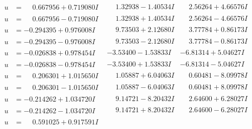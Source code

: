 \documentclass[1p]{elsarticle_modified}
\theoremstyle{definition}
\begin{document}
$$\begin{array}{c|c|c}
\begin{aligned}
u &= \phantom{-}0.667956 + 0.719080 I\end{aligned}
 & \phantom{-}1.32938 - 1.40534 I & \phantom{-}2.56264 + 4.66576 I \\ \hline\begin{aligned}
u &= \phantom{-}0.667956 - 0.719080 I\end{aligned}
 & \phantom{-}1.32938 + 1.40534 I & \phantom{-}2.56264 - 4.66576 I \\ \hline\begin{aligned}
u &= -0.294395 + 0.976008 I\end{aligned}
 & \phantom{-}9.73503 + 2.12680 I & \phantom{-}3.77784 + 0.86173 I \\ \hline\begin{aligned}
u &= -0.294395 - 0.976008 I\end{aligned}
 & \phantom{-}9.73503 - 2.12680 I & \phantom{-}3.77784 - 0.86173 I \\ \hline\begin{aligned}
u &= -0.026838 + 0.978454 I\end{aligned}
 & -3.53400 - 1.53833 I & -6.81314 + 5.04627 I \\ \hline\begin{aligned}
u &= -0.026838 - 0.978454 I\end{aligned}
 & -3.53400 + 1.53833 I & -6.81314 - 5.04627 I \\ \hline\begin{aligned}
u &= \phantom{-}0.206301 + 1.015650 I\end{aligned}
 & \phantom{-}1.05887 + 6.04063 I & \phantom{-}0.60481 - 8.09978 I \\ \hline\begin{aligned}
u &= \phantom{-}0.206301 - 1.015650 I\end{aligned}
 & \phantom{-}1.05887 - 6.04063 I & \phantom{-}0.60481 + 8.09978 I \\ \hline\begin{aligned}
u &= -0.214262 + 1.034720 I\end{aligned}
 & \phantom{-}9.14721 - 8.20432 I & \phantom{-}2.64600 + 6.28027 I \\ \hline\begin{aligned}
u &= -0.214262 - 1.034720 I\end{aligned}
 & \phantom{-}9.14721 + 8.20432 I & \phantom{-}2.64600 - 6.28027 I \\ \hline\begin{aligned}
u &= \phantom{-}0.591025 + 0.917591 I\end{aligned}

\end{array}$$
\end{document}
